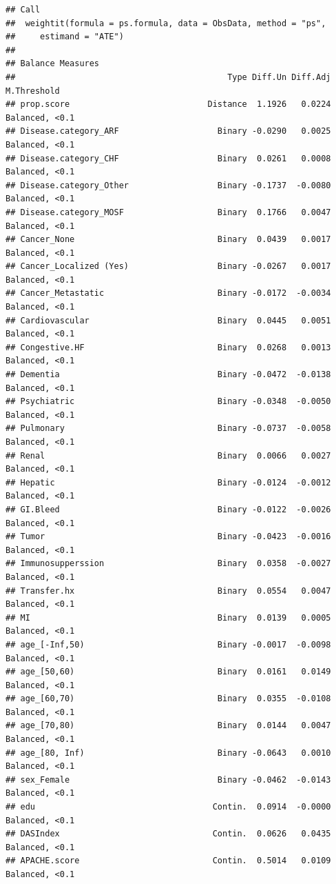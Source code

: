 \documentclass[
]{book}
\begin{document}
\begin{verbatim}
## Call
##  weightit(formula = ps.formula, data = ObsData, method = "ps", 
##     estimand = "ATE")
## 
## Balance Measures
##                                           Type Diff.Un Diff.Adj    M.Threshold
## prop.score                            Distance  1.1926   0.0224 Balanced, <0.1
## Disease.category_ARF                    Binary -0.0290   0.0025 Balanced, <0.1
## Disease.category_CHF                    Binary  0.0261   0.0008 Balanced, <0.1
## Disease.category_Other                  Binary -0.1737  -0.0080 Balanced, <0.1
## Disease.category_MOSF                   Binary  0.1766   0.0047 Balanced, <0.1
## Cancer_None                             Binary  0.0439   0.0017 Balanced, <0.1
## Cancer_Localized (Yes)                  Binary -0.0267   0.0017 Balanced, <0.1
## Cancer_Metastatic                       Binary -0.0172  -0.0034 Balanced, <0.1
## Cardiovascular                          Binary  0.0445   0.0051 Balanced, <0.1
## Congestive.HF                           Binary  0.0268   0.0013 Balanced, <0.1
## Dementia                                Binary -0.0472  -0.0138 Balanced, <0.1
## Psychiatric                             Binary -0.0348  -0.0050 Balanced, <0.1
## Pulmonary                               Binary -0.0737  -0.0058 Balanced, <0.1
## Renal                                   Binary  0.0066   0.0027 Balanced, <0.1
## Hepatic                                 Binary -0.0124  -0.0012 Balanced, <0.1
## GI.Bleed                                Binary -0.0122  -0.0026 Balanced, <0.1
## Tumor                                   Binary -0.0423  -0.0016 Balanced, <0.1
## Immunosupperssion                       Binary  0.0358  -0.0027 Balanced, <0.1
## Transfer.hx                             Binary  0.0554   0.0047 Balanced, <0.1
## MI                                      Binary  0.0139   0.0005 Balanced, <0.1
## age_[-Inf,50)                           Binary -0.0017  -0.0098 Balanced, <0.1
## age_[50,60)                             Binary  0.0161   0.0149 Balanced, <0.1
## age_[60,70)                             Binary  0.0355  -0.0108 Balanced, <0.1
## age_[70,80)                             Binary  0.0144   0.0047 Balanced, <0.1
## age_[80, Inf)                           Binary -0.0643   0.0010 Balanced, <0.1
## sex_Female                              Binary -0.0462  -0.0143 Balanced, <0.1
## edu                                    Contin.  0.0914  -0.0000 Balanced, <0.1
## DASIndex                               Contin.  0.0626   0.0435 Balanced, <0.1
## APACHE.score                           Contin.  0.5014   0.0109 Balanced, <0.1

\end{verbatim}
\end{document}
